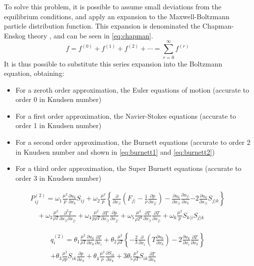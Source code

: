 To solve this problem, it is possible to assume small deviations from the equilibrium conditions, and apply an expansion to the Maxwell-Boltzmann particle distribution function. This expansion is denominated the Chapman-Enskog theory \cite{burnett}, and can be seen in \autoref{eq:chapman}.
\begin{equation}
    f=f^{(0)}+f^{(1)}+f^{(2)}+\cdots=\sum_{r=0}^{\infty} f^{(r)}
    \label{eq:chapman}
\end{equation}
It is thus possible to substitute this series expansion into the Boltzmann equation, obtaining:
\begin{itemize}
    \item For a zeroth order approximation, the Euler equations of motion (accurate to order 0 in Knudsen number)
    \item For a first order approximation, the Navier-Stokes equations (accurate to order 1 in Knudsen number)
    \item For a second order approximation, the Burnett equations (accurate to order 2 in Knudsen number and shown in \autoref{eq:burnett1} and \autoref{eq:burnett2})
    \item For a third order approximation, the Super Burnett equations (accurate to order 3 in Knudsen number)
\end{itemize}
\begin{equation}
    \begin{aligned}
        P_{i j}^{(2)}=\omega_1 \frac{\mu^2}{p} \frac{\partial u_k}{\partial x_k} S_{i j}+\omega_2 \frac{\mu^2}{p}\left\{\frac{\partial}{\partial x_{\langle i}}\left(F_{j\rangle}-\frac{1}{\rho} \frac{\partial p}{\partial x_{j\rangle}}\right)-\frac{\partial u_k}{\partial x_{\langle i}} \frac{\partial u_{j\rangle}}{\partial x_k}\right.  \left.-2 \frac{\partial u_k}{\partial x_{\langle i}} S_{j\rangle k}\right\} \\
        \quad + \omega_3 \frac{\mu^2}{\rho T} \frac{\partial^2 T}{\partial x_{\langle i} \partial x_{j\rangle}}+\omega_4 \frac{\mu^2}{p \rho T} \frac{\partial T}{\partial x_{\langle i}} \frac{\partial p}{\partial x_{j\rangle}}+\omega_5 \frac{\mu^2}{\rho T^2} \frac{\partial T}{\partial x_{\langle i}} \frac{\partial T}{\partial x_{j\rangle}} +\omega_6 \frac{\mu^2}{p} S_{k\langle i} S_{j\rangle k}
    \end{aligned}
    \label{eq:burnett1}
\end{equation}

\begin{equation}
    \begin{aligned}
        q_i^{(2)}  =\theta_1 \frac{\mu^2}{\rho T} \frac{\partial u_k}{\partial x_k} \frac{\partial T}{\partial x_i}+\theta_2 \frac{\mu^2}{\rho T}\left\{-\frac{2}{3} \frac{\partial}{\partial x_i}\left(T \frac{\partial u_k}{\partial x_k}\right)-2 \frac{\partial u_k}{\partial x_i} \frac{\partial T}{\partial x_k}\right\} \\
         +  \theta_3 \frac{\mu^2}{\rho p} S_{i k} \frac{\partial p}{\partial x_k}+\theta_4 \frac{\mu^2}{\rho} \frac{\partial S_{i k}}{\partial x_k}+3 \theta_5 \frac{\mu^2}{\rho T} S_{i k} \frac{\partial T}{\partial x_k}
    \end{aligned}
    \label{eq:burnett2}
\end{equation}

